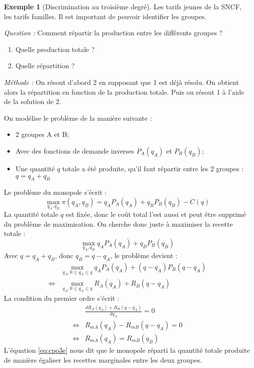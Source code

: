 \documentclass[
]{book}
\providecommand{\tightlist}{%
  \setlength{\itemsep}{0pt}\setlength{\parskip}{0pt}}
\theoremstyle{definition}
\theoremstyle{definition}
\newtheorem{example}{Exemple}[chapter]
\theoremstyle{definition}
\theoremstyle{definition}
\theoremstyle{remark}
\begin{document}
\begin{example}[Discrimination au troisième degré]
Les tarifs jeunes de la SNCF, les tarifs familles.
Il est important de pouvoir identifier les groupes.
\end{example}

\emph{Question :} Comment répartir la production entre les différents groupes ?

\begin{enumerate}
\def\labelenumi{\arabic{enumi}.}
\tightlist
\item
  Quelle production totale ?
\item
  Quelle répartition ?
\end{enumerate}

\emph{Méthode :} On résout d'abord 2 en supposant que 1 est déjà résolu.
On obtient alors la répartition en fonction de la production totale.
Puis ou résout 1 à l'aide de la solution de 2.

On modélise le problème de la manière suivante :

\begin{itemize}
\tightlist
\item
  2 groupes A et B;
\item
  Avec des fonctions de demande inverses \(P_A(q_A)\) et \(P_B(q_B)\);
\item
  Une quantité \(q\) totale a été produite, qu'il faut répartir entre les 2 groupes : \(q=q_A+q_B\)
\end{itemize}

Le problème du monopole s'écrit :
\[
\max_{q_A, q_B} \pi(q_A, q_B) = q_AP_A(q_A) + q_BP_B(q_B) -C(q)
\]
La quantité totale \(q\) est fixée, donc le coût total l'est aussi et peut être supprimé du problème de maximisation.
On cherche donc juste à maximiser la recette totale :
\[
\max_{q_A, q_B} q_AP_A(q_A) + q_BP_B(q_B) 
\]
Avec \(q=q_A+q_B\), donc \(q_B=q-q_A\), le problème devient :
\[
\begin{array}{rl}
&\max_{q_A, 0\leq q_A\leq q} q_AP_A(q_A) + (q-q_A)P_B(q-q_A) \\
\Leftrightarrow &\max_{q_A, 0\leq q_A\leq q} R_A(q_A) + R_B(q-q_A) 
\end{array}
\]
La condition du premier ordre s'écrit :
\[
\begin{array}{rl}
&\frac{dR_A(q_A) + R_B(q-q_A) }{dq_A} = 0\\
\Leftrightarrow & R_{mA}(q_A) - R_{mB}(q-q_A) = 0\\
\Leftrightarrow & R_{mA}(q_A) = R_{mB}(q_B) 
\label{eq:cpo3e}
\end{array}
\]
L'équation \eqref{eq:cpo3e} nous dit que le monopole réparti la quantité totale produite de manière égaliser les recettes marginales entre les deux groupes.
\end{document}
